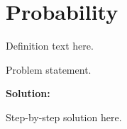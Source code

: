 \section{Probability}


\begin{definition}[Term]
Definition text here.
\end{definition}

\begin{example}
Problem statement.

\textbf{Solution:}

Step-by-step solution here.
\end{example}
